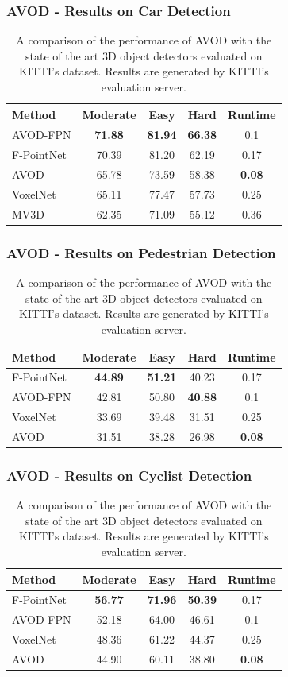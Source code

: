 \documentclass[10pt,fleqn,unknownkeysallowed]{beamer}
\begin{document}
\begin{frame}
	\frametitle{AVOD - Results on Car Detection}
\begin{table}
	\begin{tabular}{l | c | c | c | c }
		Method & Moderate & Easy & Hard & Runtime \\
		\hline \hline
		AVOD-FPN & \textbf{71.88} & \textbf{81.94} & \textbf{66.38} & 0.1 \\
		F-PointNet & 70.39 & 81.20 & 62.19  & 0.17 \\ 
		AVOD & 65.78 & 73.59 & 58.38 & \textbf{0.08} \\
		VoxelNet & 65.11 & 77.47 & 57.73 & 0.25 \\
		MV3D & 62.35 & 71.09 & 55.12 & 0.36 \\
	\end{tabular}
	\caption{A comparison of the performance of AVOD with the state of the art 3D object detectors evaluated on KITTI's dataset. Results are generated by KITTI's evaluation server.}
\end{table}
\end{frame}

\begin{frame}
	\frametitle{AVOD - Results on Pedestrian Detection}
	\begin{table}
		\begin{tabular}{l | c | c | c | c }
			Method & Moderate & Easy & Hard & Runtime \\
			\hline \hline
			F-PointNet & \textbf{44.89} & \textbf{51.21} & 40.23 & 0.17 \\
			AVOD-FPN & 42.81 & 50.80 & \textbf{40.88} & 0.1 \\
			VoxelNet & 33.69 & 39.48 & 31.51	 & 0.25 \\ 
			AVOD & 31.51 & 38.28 & 26.98 & \textbf{0.08} \\
		\end{tabular}
		\caption{A comparison of the performance of AVOD with the state of the art 3D object detectors evaluated on KITTI's dataset. Results are generated by KITTI's evaluation server.}
	\end{table}
\end{frame}

\begin{frame}
	\frametitle{AVOD - Results on Cyclist Detection}
	\begin{table}
		\begin{tabular}{l | c | c | c | c }
			Method & Moderate & Easy & Hard & Runtime \\
			\hline \hline
			F-PointNet & \textbf{56.77} & \textbf{71.96} & \textbf{50.39}  & 0.17 \\
			AVOD-FPN & 52.18 & 64.00 & 46.61 & 0.1 \\
			VoxelNet & 48.36 & 61.22 & 44.37 & 0.25 \\ 
			AVOD & 44.90  & 60.11 & 38.80 & \textbf{0.08} \\
		\end{tabular}
		\caption{A comparison of the performance of AVOD with the state of the art 3D object detectors evaluated on KITTI's dataset. Results are generated by KITTI's evaluation server.}
	\end{table}
\end{frame}
\end{document}
